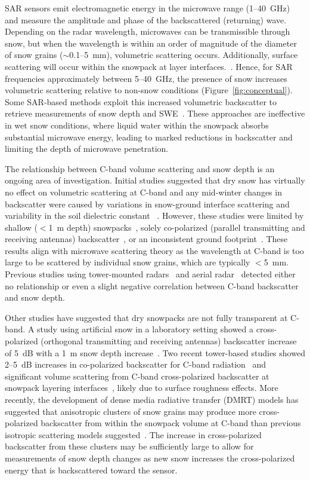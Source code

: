 \documentclass[journal abbreviation, manuscript]{copernicus}
\begin{document}
SAR sensors emit electromagnetic energy in the microwave range (1--40~GHz) and measure the amplitude and phase of the backscattered (returning) wave. Depending on the radar wavelength, microwaves can be transmissible through snow, but when the wavelength is within an order of magnitude of the diameter of snow grains ($\sim$0.1--5~mm), volumetric scattering occurs. Additionally, surface scattering will occur within the snowpack at layer interfaces.~\citep{Naderpour.2022, Tsang.2022}. Hence, for SAR frequencies approximately between 5--40~GHz, the presence of snow increases volumetric scattering relative to non-snow conditions (Figure~\ref{fig:conceptual}). Some SAR-based methods exploit this increased volumetric backscatter to retrieve measurements of snow depth and SWE~\citep{Tsang.2022}. These approaches are ineffective in wet snow conditions, where liquid water within the snowpack absorbs substantial microwave energy, leading to marked reductions in backscatter and limiting the depth of microwave penetration.

The relationship between C-band volume scattering and snow depth is an ongoing area of investigation. Initial studies suggested that dry snow has virtually no effect on volumetric scattering at C-band and any mid-winter changes in backscatter were caused by variations in snow-ground interface scattering and variability in the soil dielectric constant ~\citep{Wegmüller.1990, Bernier.1999, Sun.2015}. However, these studies were limited by shallow ($<$1~m depth) snowpacks~\citep{Bernier.1998, Fuller.2009}, solely co-polarized (parallel transmitting and receiving antennas) backscatter~\citep{Mätzler.1987, Fuller.2009, Shi.2000}, or an inconsistent ground footprint~\citep{Strozzi.1997}. These results align with microwave scattering theory as the wavelength at C-band is too large to be scattered by individual snow grains, which are typically $<$5~mm. Previous studies using tower-mounted radars~\citep{Strozzi.1997, Mätzler.1987} and aerial radar~\citep{Bernier.1998} detected either no relationship or even a slight negative correlation between C-band backscatter and snow depth.

Other studies have suggested that dry snowpacks are not fully transparent at C-band. A study using artificial snow in a laboratory setting showed a cross-polarized (orthogonal transmitting and receiving antennas) backscatter increase of 5~dB with a 1~m snow depth increase~\citep{Kendra.1995}. Two recent tower-based studies showed 2--5~dB increases in co-polarized backscatter for C-band radiation~\citep{Naderpour.2022} and significant volume scattering from C-band cross-polarized backscatter at snowpack layering interfaces~\citep{Brangers.2023}, likely due to surface roughness effects. More recently, the development of dense media radiative transfer (DMRT) models has suggested that anisotropic clusters of snow grains may produce more cross-polarized backscatter from within the snowpack volume at C-band than previous isotropic scattering models suggested~\citep{West.2000, Ding.2010, Chang.2014, Zhu.2023}. The increase in cross-polarized backscatter from these clusters may be sufficiently large to allow for measurements of snow depth changes as new snow increases the cross-polarized energy that is backscattered toward the sensor.
\end{document}
